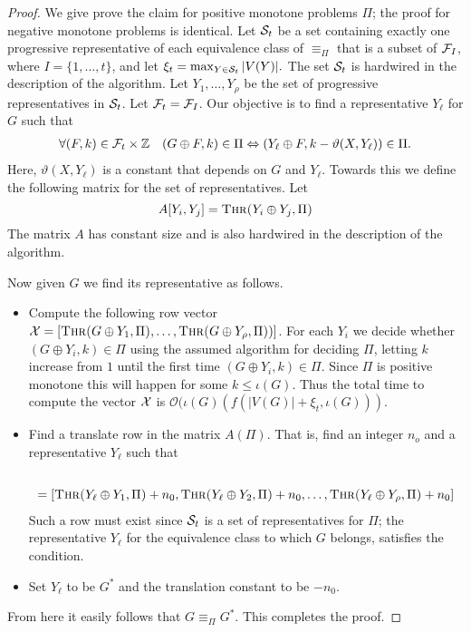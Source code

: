 \documentclass[11pt]{article}
\newcommand{\cO}{\mathcal{O}}
\begin{document}
\begin{proof}
We give prove the claim for positive monotone problems $\Pi$; the proof for negative monotone problems is identical. 
Let  ${\cal S}_t$  be
a set containing exactly one progressive representative of each equivalence class of $\equiv_{\Pi}$ that is a subset of 
${\cal F}_{I}$, where $I=\{1,\ldots,t\}$, and  let  $\xi_t=\max_{Y\in {\cal S}_{t}}|V(Y)|.$ The set  ${\cal S}_{t}$ is hardwired in the description of the algorithm. 
 Let $Y_1,\ldots,Y_\rho$ be the set of progressive representatives in ${\cal S}_{t}$. Let ${\cal F}_{t}={\cal F}_{I}$. Our objective is to find 
  a representative $Y_\ell$  for  $G$ such that 
 \begin{eqnarray}
\forall (F,k)\in {\cal F}_{t}
\times \Bbb{Z} & &   (G \oplus F, k) \in \Pi  \Leftrightarrow    (Y_\ell \oplus F, k-\vartheta(X,Y_\ell)) \in \Pi. 
\label{eq:progresivereplacement}
\end{eqnarray}
Here, $\vartheta(X,Y_\ell)$ is a constant  that depends on $G$ and $Y_\ell$.  Towards this   
we define the following matrix for the set of representatives. Let 
$$A[Y_i, Y_j]=  \mbox{{\sc Thr($Y_i\oplus Y_j,\Pi$)}}$$
The matrix $A$ has constant size and is also hardwired in the description of the algorithm. 


Now given $G$ we find its representative as follows. 
\begin{itemize}
\item Compute the following row vector ${\cal X}=[ \mbox{{\sc Thr($G\oplus Y_1,\Pi$)}}, \ldots ,  
\mbox{{\sc Thr($G\oplus Y_\rho,\Pi$)}})]$. For each $Y_i$ we decide whether $(G\oplus Y_i,k)\in \Pi$ using the assumed algorithm for deciding 
$\Pi$,  letting $k$ increase from $1$ until the first time $(G\oplus Y_i,k)\in \Pi$. Since $\Pi$ is positive monotone this will happen for some 
$k\leq \iota(G)$. Thus the total time to compute the vector ${\cal X}$ is $\cO(\iota(G)(f(|V(G)|+\xi_t,\iota(G)))$. 

\item Find a translate row in the matrix $A(\Pi)$. That is, find an integer $n_o$ and a representative 
$Y_\ell$ such that  
\begin{eqnarray*}
[ \mbox{{\sc Thr($G\oplus Y_1,\Pi$)}},  \mbox{{\sc Thr($G\oplus Y_2,\Pi$)}}, \ldots ,  
\mbox{{\sc Thr($G\oplus Y_\rho,\Pi$)}}] \\
=[ \mbox{{\sc Thr($Y_\ell\oplus Y_1,\Pi$)}}+n_0,  \mbox{{\sc Thr($Y_\ell\oplus Y_2,\Pi$)}}+n_0, \ldots ,  
\mbox{{\sc Thr($Y_\ell\oplus Y_\rho,\Pi$)}}+n_0]
\end{eqnarray*}
Such a row must exist since ${\cal S}_t$ is  a set of representatives for $\Pi$; the representative $Y_\ell$ for the equivalence class to which $G$ belongs, satisfies the condition.  
\item Set $Y_\ell$ to be $G^*$ and the translation constant to be $-n_0$.
\end{itemize}
From here it easily follows that $G\equiv_{\Pi}G^*$. This completes the proof.  
\end{proof}
\end{document}
